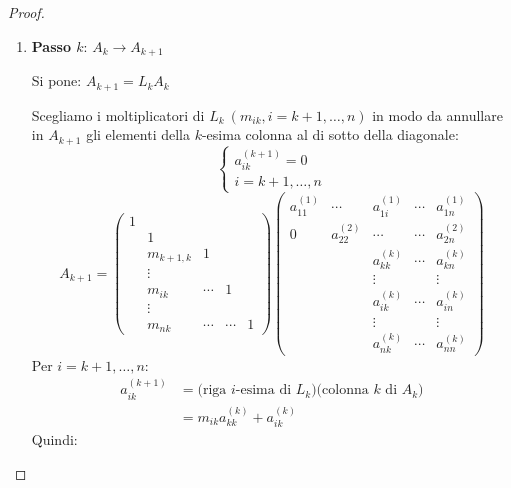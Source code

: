 \documentclass[12pt]{report}
\begin{document}
\begin{proof}
\begin{enumerate}
		I restanti elementi di $A_2$ saranno:
		\[
		\begin{cases}
			a^{(2)}_{ij} = a^{(1)}_{ij} + m_{i1} + a_{1j}^{(1)}\\
			i, j = 2, \dots, n
		\end{cases}
		\]
		Ora descriviamo il passo $k$, che costruisce la matrice $A_{k+1}$ a partire dalla matrice $A_k$ con la seguente \textbf{ipotesi di induzione}: \textit{la matrice $A_k$ ha nulli tutti gli elementi delle prime $k-1$ colonne al di sotto della diagonale}.
		\item \textbf{Passo $k$}: $A_k \to A_{k + 1}$

		Si pone: $A_{k+1} = L_kA_k$

		Scegliamo i moltiplicatori di $L_k\ (m_{ik}, i = k+1, \dots, n)$ in modo da annullare in $A_{k+1}$ gli elementi della $k$-esima colonna al di sotto della diagonale:
		\[
		\begin{cases}
			a_{ik}^{(k+1)} = 0\\
			i = k + 1, \dots, n
		\end{cases}
		\]
		\[
		A_{k+1} = \begin{pmatrix}
			1 \\
			& 1 \\
			& m_{k+1, k} & 1 \\
			& \vdots \\
			& m_{ik} & \cdots & 1 \\
			& \vdots \\
			& m_{nk} & \cdots & \cdots & 1
		\end{pmatrix}\begin{pmatrix}
			a^{(1)}_{11} & \cdots & a^{(1)}_{1i} & \cdots & a^{(1)}_{1n} \\
			0 & a^{(2)}_{22} & \cdots & \cdots & a^{(2)}_{2n} \\
			 &  & a^{(k)}_{kk} & \cdots & a^{(k)}_{kn} \\
			 & & \vdots & & \vdots \\
			 &  & a^{(k)}_{ik} & \cdots & a^{(k)}_{in} \\
			 & & \vdots &  & \vdots \\
			 &  & a^{(k)}_{nk} & \cdots & a^{(k)}_{nn}
		\end{pmatrix}
		\]
		Per $i = k+1, \dots, n$:
		\begin{align*}
			a^{(k+1)}_{ik} &= \text{(riga $i$-esima di $L_k$)(colonna $k$ di $A_k$)} \\
			&= m_{ik}a^{(k)}_{kk} + a^{(k)}_{ik}
		\end{align*}
		Quindi:
		\[
\]
\end{enumerate}
\end{proof}
\end{document}
